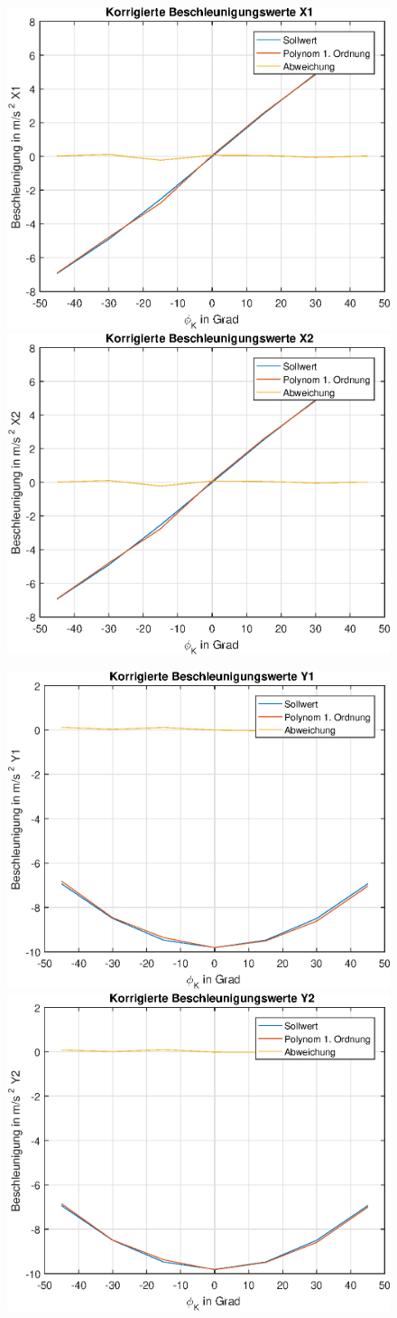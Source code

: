 \documentclass{article}
\begin{document}
\newpage
\begin{figure}[h]
	\includegraphics[width=0.5\linewidth]{img/X1_mean_correction.eps}
	\includegraphics[width=0.5\linewidth]{img/X2_mean_correction.eps}
\end{figure}
\begin{figure}[h]
	\includegraphics[width=0.5\linewidth]{img/Y1_mean_correction.eps}
	\includegraphics[width=0.5\linewidth]{img/Y2_mean_correction.eps}
\end{figure}
\end{document}
